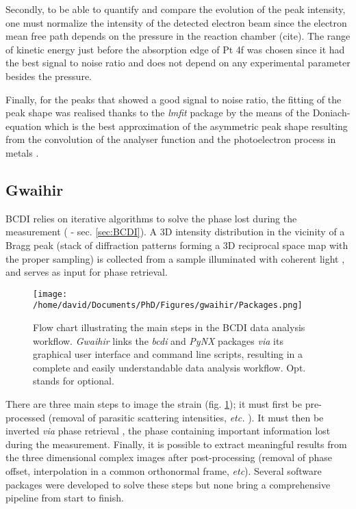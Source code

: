 Secondly, to be able to quantify and compare the evolution of the peak intensity, one must normalize the intensity of the detected electron beam since the electron mean free path depends on the pressure in the reaction chamber (cite).
The range of kinetic energy just before the absorption edge of Pt 4f was chosen since it had the best signal to noise ratio and does not depend on any experimental parameter besides the pressure.

Finally, for the peaks that showed a good signal to noise ratio, the fitting of the peak shape was realised thanks to the \textit{lmfit} \parencite{Newville2016} package by the means of the Doniach-equation which is the best approximation of the asymmetric peak shape resulting from the convolution of the analyser function and the photoelectron process in metals \parencite{Doniach_1970}.

\subsection{Gwaihir} \label{sec:Gwaihir}

BCDI relies on iterative algorithms to solve the phase lost during the measurement (\cite{robinson_coherent_2009} - sec. \ref{sec:BCDI}).
A 3D intensity distribution in the vicinity of a Bragg peak (stack of diffraction patterns forming a 3D reciprocal space map with the proper sampling) is collected from a sample illuminated with coherent light \parencite{robinson_coherent_2005}, and serves as input for phase retrieval.

\begin{figure}[!htb]
    \texttt{[image: /home/david/Documents/PhD/Figures/gwaihir/Packages.png]}
    \caption{Flow chart illustrating the main steps in the BCDI data analysis workflow. \textit{Gwaihir} links the \textit{bcdi} and \textit{PyNX} packages \textit{via} its graphical user interface and command line scripts, resulting in a complete and easily understandable data analysis workflow. Opt. stands for optional.
    }
    \label{fig:Packages}
\end{figure}

There are three main steps to image the strain (fig. \ref{fig:Packages}); it must first be pre-processed (removal of parasitic scattering intensities, \textit{etc.} \parencite{ozturk_performance_2017}).
It must then be inverted \textit{via} phase retrieval \parencite{miao_possible_2000}, the phase containing important information lost during the measurement.
Finally, it is possible to extract meaningful results from the three dimensional complex images after post-processing (removal of phase offset, interpolation in a common orthonormal frame, \textit{etc}).
Several software packages were developed to solve these steps but none bring a comprehensive pipeline from start to finish.

